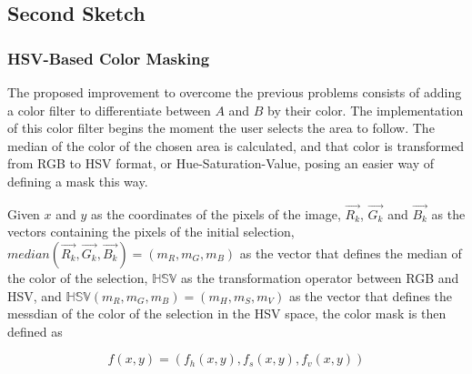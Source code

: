 \subsection{Second Sketch}

\subsubsection{HSV-Based Color Masking}

The proposed improvement to overcome the previous problems consists of adding a color filter to differentiate between $A$ and $B$ by their color. The implementation of this color filter begins the moment the user selects the area to follow. The median of the color of the chosen area is calculated, and that color is transformed from RGB to HSV format, or Hue-Saturation-Value, posing an easier way of defining a mask this way.

Given $x$ and $y$ as the coordinates of the pixels of the image, $\vec{R_k}$, $\vec{G_k}$ and $\vec{B_k}$ as the vectors containing the pixels of the initial selection, $median(\vec{R_k}, \vec{G_k}, \vec{B_k}) = (m_R, m_G, m_B)$ as the vector that defines the median of the color of the selection, $\mathbb{HSV}$ as the transformation operator between RGB and HSV, and $\mathbb{HSV}(m_R, m_G, m_B) = (m_H, m_S, m_V)$ as the vector that defines the messdian of the color of the selection in the HSV space, the color mask is then defined as


\begin{equation}
f(x, y) = (f_h(x, y), f_s(x, y), f_v(x, y))
\end{equation}

